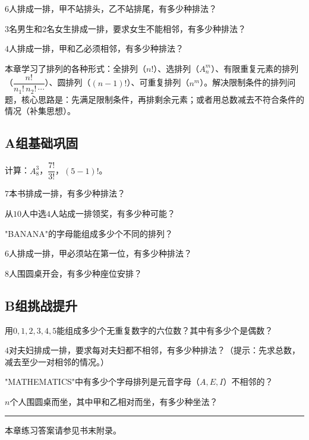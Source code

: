 \begin{exercise}
\item $6$人排成一排，甲不站排头，乙不站排尾，有多少种排法？
\item $3$名男生和$2$名女生排成一排，要求女生不能相邻，有多少种排法？
\item $4$人排成一排，甲和乙必须相邻，有多少种排法？
\end{exercise}


本章学习了排列的各种形式：全排列（$n!$）、选排列（$A_n^m$）、有限重复元素的排列（$\dfrac{n!}{n_1!\,n_2!\,\cdots}$）、圆排列（$(n-1)!$）、可重复排列（$n^m$）。解决限制条件的排列问题，核心思路是：先满足限制条件，再排剩余元素；或者用总数减去不符合条件的情况（补集思想）。


\subsection*{A组\quad 基础巩固}

\begin{exercise}
\item 计算：$A_8^3$，$\dfrac{7!}{3!}$，$(5-1)!$。
\item $7$本书排成一排，有多少种排法？
\item 从$10$人中选$4$人站成一排领奖，有多少种可能？
\item "BANANA"的字母能组成多少个不同的排列？
\item $6$人排成一排，甲必须站在第一位，有多少种排法？
\item $8$人围圆桌开会，有多少种座位安排？
\end{exercise}

\subsection*{B组\quad 挑战提升}

\begin{exercise}
\item 用$0,1,2,3,4,5$能组成多少个无重复数字的六位数？其中有多少个是偶数？
\item $4$对夫妇排成一排，要求每对夫妇都不相邻，有多少种排法？（提示：先求总数，减去至少一对相邻的情况。）
\item "MATHEMATICS"中有多少个字母排列是元音字母（$A,E,I$）不相邻的？
\item $n$个人围圆桌而坐，其中甲和乙相对而坐，有多少种坐法？
\end{exercise}

\vfill
\noindent\rule{\textwidth}{0.4pt}
本章练习答案请参见书末附录。
